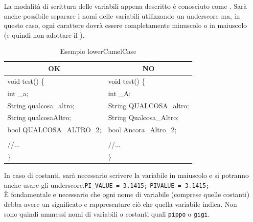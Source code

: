La modalità di scrittura delle variabili appena descritto è conosciuto come . Sarà anche possibile separare i nomi delle variabili utilizzando un underscore ma, in questo caso, ogni carattere dovrà essere completamente minuscolo o in maiuscolo (e quindi non adottare il ).\\
\begin{table} [H]
	\begin{center}
		\begin{tabular}{ | l | l |}
			\multicolumn{1}{c}{\textbf{OK}}&\multicolumn{1}{c}{\textbf{NO}}\\ 
			\hline
			void test() \{
			&void test() \{\\
			\hspace{0.5cm}int \_a;
			&\hspace{0.5cm}int \_A;\\
			\hspace{0.5cm}String qualcosa\_altro;
			&\hspace{0.5cm}String QUALCOSA\_altro;\\
			\hspace{0.5cm}String qualcosaAltro;
			&\hspace{0.5cm}String Qualcosa\_Altro;\\
			\hspace{0.5cm}bool QUALCOSA\_ALTRO\_2;
			&\hspace{0.5cm}bool Ancora\_Altro\_2;\\
			&\\
			\hspace{0.5cm}//...									&
			\hspace{0.5cm}//... \\
			\}&\}\\
			\hline
		\end{tabular}
	\end{center}
	\caption{Esempio lowerCamelCase}
\end{table}
	
In caso di costanti, sarà necessario scrivere la variabile in maiuscolo e si potranno anche usare gli underscore.\hspace{1cm}\texttt{PI\_VALUE  = 3.1415;} \hspace{0.5cm} \texttt{PIVALUE = 3.1415;}\\[0.5cm]
È fondamentale e necessario che ogni nome di variabile (comprese quelle costanti) debba avere un significato e rappresentare ciò che quella variabile indica. Non sono quindi ammessi nomi di variabili o costanti quali \texttt{pippo} o \texttt{gigi}.
